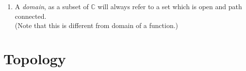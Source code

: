 \documentclass[12pt]{article}
\theoremstyle{definition}
\numberwithin{thm}{section}
\begin{document}
\begin{enumerate}
	\item A \emph{domain}, as a subset of $\mathbb{C}$ will always refer to a set which is open and path connected.\\
	(Note that this is different from domain of a function.)
\end{enumerate}
\newpage\section{Topology}
\end{document}

